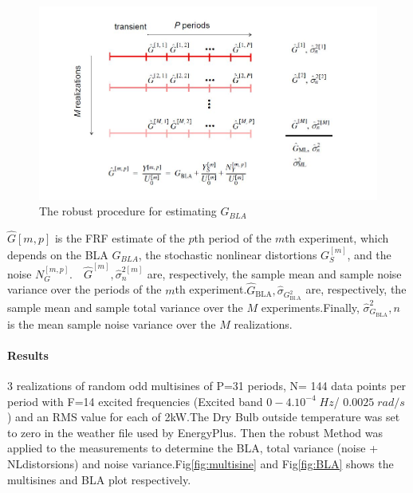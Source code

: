 \documentclass[a4paper,12pt]{article}
\numberwithin{equation}{section}
\begin{document}
\begin{figure}[H]
    \includegraphics[scale=0.9]{robust_procedure.JPG}
    \centering
    \caption{The robust procedure for estimating $G_{BLA}$}
    \label{fig:robust procedure}
\end{figure}

\noindent

$\hat{G}[m, p]$ is the FRF estimate of the $p$th period of the $m$th experiment, which depends on the BLA $G_{BLA}$, the stochastic nonlinear distortions $G_{S}^{[m]}$, and the noise $N_{G}^{[m, p]}$.$ \quad \hat{G}^{[m]}, \hat{\sigma}_{n}^{2[m]}$ are, respectively, the sample mean and sample noise variance over the periods of the $m$th   experiment.$\hat{G}_{\mathrm{BLA}},\hat{\sigma}_{G_{\mathrm{Bl.A}}^{2}}$ are, respectively, the sample mean and sample total variance over the $M$ experiments.Finally, $\hat{\sigma}_{G_{\mathrm{BLA}}}^{2}, n$ is the mean sample noise variance over the $M$ realizations.

\paragraph{Results}

3 realizations of random odd multisines of P=31 periods, N= 144 data points per period with F=14 excited frequencies (Excited band $0-4.10^{-4}\;Hz$/ $0.0025\;rad/s$) and an RMS value for each of 2kW.The Dry Bulb outside temperature was set to zero in the weather file used by EnergyPlus. Then the robust Method was applied to the measurements to determine the BLA, total variance (noise + NLdistorsions) and noise variance.Fig\ref{fig:multisine} and Fig\ref{fig:BLA} shows the multisines and BLA plot respectively.
\end{document}
